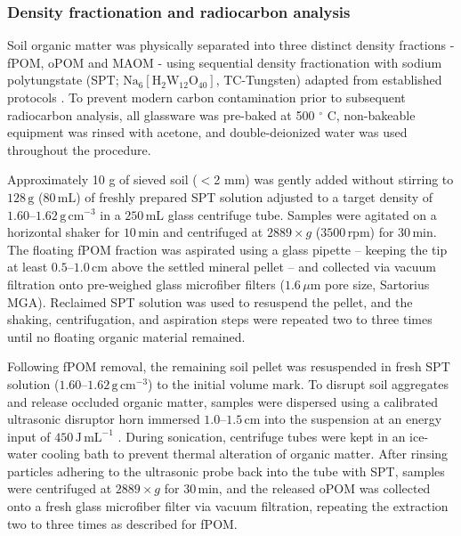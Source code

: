 \documentclass[preprint,12pt]{elsarticle}
\begin{document}
\subsubsection{Density fractionation and radiocarbon analysis}
Soil organic matter was physically separated into three distinct density fractions - fPOM, oPOM and MAOM - using sequential density fractionation with sodium polytungstate (SPT; $\text{Na}_6[\text{H}_2\text{W}_{12}\text{O}_{40}]$, TC-Tungsten) adapted from established protocols \citep{Gaudinski2000, Crow2007}. To prevent modern carbon contamination prior to subsequent radiocarbon analysis, all glassware was pre-baked at 500 $^\circ$ C, non-bakeable equipment was rinsed with acetone, and double-deionized water was used throughout the procedure.

Approximately 10 g of sieved soil ($<$2 mm) was gently added without stirring to $128\,\text{g}$ ($80\,\text{mL}$) of freshly prepared SPT solution adjusted to a target density of $1.60\text{--}1.62\,\text{g}\,\text{cm}^{-3}$ in a $250\,\text{mL}$ glass centrifuge tube. Samples were agitated on a horizontal shaker for $10\,\text{min}$ and centrifuged at $2889 \times g$ ($3500\,\text{rpm}$) for $30\,\text{min}$. The floating fPOM fraction was aspirated using a glass pipette – keeping the tip at least $0.5\text{--}1.0\,\text{cm}$ above the settled mineral pellet – and collected via vacuum filtration onto pre-weighed glass microfiber filters ($1.6\,\mu\text{m}$ pore size, Sartorius MGA). Reclaimed SPT solution was used to resuspend the pellet, and the shaking, centrifugation, and aspiration steps were repeated two to three times until no floating organic material remained.

Following fPOM removal, the remaining soil pellet was resuspended in fresh SPT solution ($1.60\text{--}1.62\,\text{g}\,\text{cm}^{-3}$) to the initial volume mark. To disrupt soil aggregates and release occluded organic matter, samples were dispersed using a calibrated ultrasonic disruptor horn immersed $1.0\text{--}1.5\,\text{cm}$ into the suspension at an energy input of $450\,\text{J}\,\text{mL}^{-1}$ \citep{Crow2007, Guggenberger2013}. During sonication, centrifuge tubes were kept in an ice-water cooling bath to prevent thermal alteration of organic matter. After rinsing particles adhering to the ultrasonic probe back into the tube with SPT, samples were centrifuged at $2889 \times g$ for $30\,\text{min}$, and the released oPOM was collected onto a fresh glass microfiber filter via vacuum filtration, repeating the extraction two to three times as described for fPOM.
\end{document}
